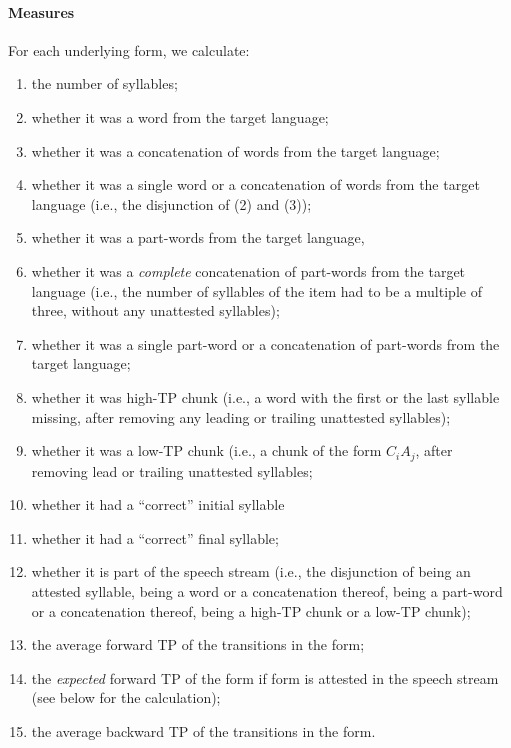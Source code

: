 \documentclass[
]{article}
\providecommand{\tightlist}{%
  \setlength{\itemsep}{0pt}\setlength{\parskip}{0pt}}
\begin{document}
\paragraph{Measures}\label{measures}

For each underlying form, we calculate:

\begin{enumerate}
\def\labelenumi{\arabic{enumi}.}
\tightlist
\item
  the number of syllables;
\item
  whether it was a word from the target language;
\item
  whether it was a concatenation of words from the target language;
\item
  whether it was a single word or a concatenation of words from the
  target language (i.e., the disjunction of (2) and (3));
\item
  whether it was a part-words from the target language,
\item
  whether it was a \emph{complete} concatenation of part-words from the
  target language (i.e., the number of syllables of the item had to be a
  multiple of three, without any unattested syllables);
\item
  whether it was a single part-word or a concatenation of part-words
  from the target language;
\item
  whether it was high-TP chunk (i.e., a word with the first or the last
  syllable missing, after removing any leading or trailing unattested
  syllables);
\item
  whether it was a low-TP chunk (i.e., a chunk of the form \(C_iA_j\),
  after removing lead or trailing unattested syllables;
\item
  whether it had a ``correct'' initial syllable
\item
  whether it had a ``correct'' final syllable;
\item
  whether it is part of the speech stream (i.e., the disjunction of
  being an attested syllable, being a word or a concatenation thereof,
  being a part-word or a concatenation thereof, being a high-TP chunk or
  a low-TP chunk);
\item
  the average forward TP of the transitions in the form;
\item
  the \emph{expected} forward TP of the form if form is attested in the
  speech stream (see below for the calculation);
\item
  the average backward TP of the transitions in the form.
\end{enumerate}
\end{document}
